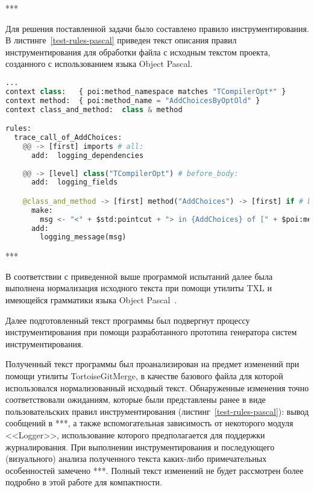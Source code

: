 ***

Для решения поставленной задачи было составлено правило инструментирования.
В листинге~\ref{test-rules-pascal} приведен текст описания правил инструментирования для обработки файла с исходным текстом проекта, созданного с использованием языка Object Pascal.

\begin{lstlisting}[frame=single, language=Python, label={test-rules-pascal}, caption={Описание правил инструментирования. Object Pascal-проект.}]
...
context class:   { poi:method_namespace matches "TCompilerOpt*" }
context method:  { poi:method_name = "AddChoicesByOptOld" }
context class_and_method:  class & method

rules:
  trace_call_of_AddChoices:
    @@ -> [first] imports # all:
      add:  logging_dependencies
  
    @@ -> [level] class("TCompilerOpt") # before_body:
      add:  logging_fields

    @class_and_method -> [first] method("AddChoices") -> [first] if # before:
      make:
        msg <- "<" + $std:pointcut + "> in {AddChoices} of [" + $poi:method_name_full + "] method";
      add:
        logging_message(msg)
\end{lstlisting}

***

В соответствии с приведенной выше программой испытаний далее была выполнена нормализация исходного текста при помощи утилиты TXL и имеющейся грамматики языка Object Pascal~\cite{txl-resources}.

Далее подготовленный текст программы был подвергнут процессу инструментирования при помощи разработанного прототипа генератора систем инструментирования.

Полученный текст программы был проанализирован на предмет изменений при помощи утилиты TortoiseGitMerge, в качестве базового файла для которой использовался нормализованный исходный текст.
Обнаруженные изменения точно соответствовали ожиданиям, которые были представлены ранее в виде пользовательских правил инструментирования (листинг~\ref{test-rules-pascal}):
вывод сообщений в ***,
а также вспомогательная зависимость от некоторого модуля <<Logger>>, использование которого предполагается для поддержки журналирования.
При выполнении инструментирования и последующего (визуального) анализа полученного текста каких-либо примечательных особенностей замечено ***.
Полный текст изменений не будет рассмотрен более подробно в этой работе для компактности.

